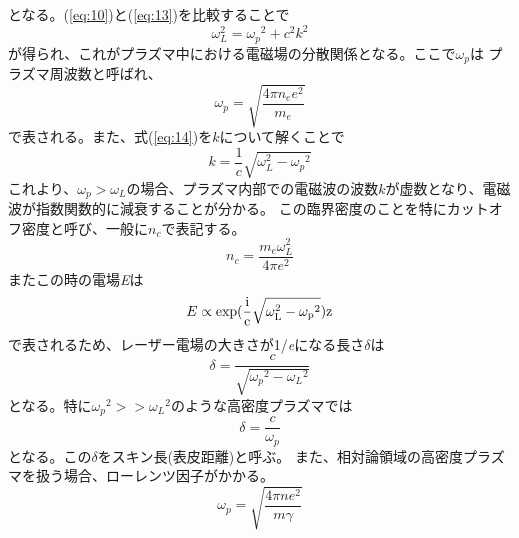 \documentclass[a4paper,11pt,titlepage]{jsarticle}
\begin{document}
  となる。(\ref{eq:10})と(\ref{eq:13})を比較することで
  \begin{equation}
    \label{eq:14}
    \omega_L^2={\omega_p}^2+c^2 k^2
  \end{equation}
  が得られ、これがプラズマ中における電磁場の分散関係となる。ここで$\omega_p$は
  プラズマ周波数と呼ばれ、
  \begin{equation}
    \label{eq:15}
    \omega_p = \sqrt{\frac{4\pi n_e e^2}{m_e}}
  \end{equation}
  で表される。また、式(\ref{eq:14})を$k$について解くことで
  \begin{equation}
    \label{eq:16}
    k=\frac{1}{c} \sqrt{\omega_L^2 - {\omega_p}^2}
  \end{equation}
  これより、$\omega_p > \omega_L$の場合、プラズマ内部での電磁波の波数$k$が虚数となり、電磁波が指数関数的に減衰することが分かる。
  この臨界密度のことを特にカットオフ密度と呼び、一般に$n_c$で表記する。
  \begin{equation}
    \label{eq:17}
    n_c=\frac{m_e \omega_L^2}{4\pi e^2}
  \end{equation}
  またこの時の電場\textit{E}は
  \begin{equation}
    \label{eq:18}
    E\propto \rm{exp}(\frac{i}{c} \sqrt{\omega_L^2 - {\omega_p}^2})z
  \end{equation}
  で表されるため、レーザー電場の大きさが1/\textit{e}になる長さ$\delta$は
  \begin{equation}
    \label{eq:19}
    \delta = \frac{c}{\sqrt{{\omega_p}^2-{\omega_L}^2}}
  \end{equation}  
  となる。特に${\omega_p}^2>>{\omega_L}^2$のような高密度プラズマでは
  \begin{equation}
    \label{eq:20}
    \delta = \frac{c}{\omega_p}
  \end{equation}
  となる。この$\delta$をスキン長(表皮距離)と呼ぶ。
  また、相対論領域の高密度プラズマを扱う場合、ローレンツ因子がかかる。
  \begin{equation}
    \label{eq:21}
    \omega_p=\sqrt{\frac{4\pi ne^2}{m\gamma}}
  \end{equation} 
  
\end{document}

